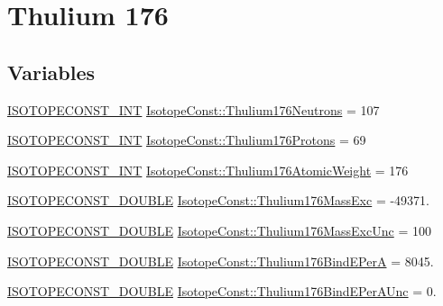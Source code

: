 \hypertarget{group___isotope_const-_thulium-_tm176}{}\section{Thulium 176}
\label{group___isotope_const-_thulium-_tm176}
\subsection*{Variables}
\begin{DoxyCompactItemize}
\item 
\mbox{\hyperlink{group___isotope_const-_macros_ga5f18360b3e99483a35c32d789e62621c}{I\+S\+O\+T\+O\+P\+E\+C\+O\+N\+S\+T\+\_\+\+I\+NT}} \mbox{\hyperlink{group___isotope_const-_thulium-_tm176_ga376e8fe714611eaf5e4bf0782cde3e6e}{Isotope\+Const\+::\+Thulium176\+Neutrons}} = 107
\item 
\mbox{\hyperlink{group___isotope_const-_macros_ga5f18360b3e99483a35c32d789e62621c}{I\+S\+O\+T\+O\+P\+E\+C\+O\+N\+S\+T\+\_\+\+I\+NT}} \mbox{\hyperlink{group___isotope_const-_thulium-_tm176_gaa7913fafe739b898368707e7558629c7}{Isotope\+Const\+::\+Thulium176\+Protons}} = 69
\item 
\mbox{\hyperlink{group___isotope_const-_macros_ga5f18360b3e99483a35c32d789e62621c}{I\+S\+O\+T\+O\+P\+E\+C\+O\+N\+S\+T\+\_\+\+I\+NT}} \mbox{\hyperlink{group___isotope_const-_thulium-_tm176_ga98bfb416e4308192d02c908471e7030b}{Isotope\+Const\+::\+Thulium176\+Atomic\+Weight}} = 176
\item 
\mbox{\hyperlink{group___isotope_const-_macros_ga8f45a7272ce02c0b4c65c44636ed719a}{I\+S\+O\+T\+O\+P\+E\+C\+O\+N\+S\+T\+\_\+\+D\+O\+U\+B\+LE}} \mbox{\hyperlink{group___isotope_const-_thulium-_tm176_ga06bffe2f883993703e49dcc008575cb9}{Isotope\+Const\+::\+Thulium176\+Mass\+Exc}} = -\/49371.
\item 
\mbox{\hyperlink{group___isotope_const-_macros_ga8f45a7272ce02c0b4c65c44636ed719a}{I\+S\+O\+T\+O\+P\+E\+C\+O\+N\+S\+T\+\_\+\+D\+O\+U\+B\+LE}} \mbox{\hyperlink{group___isotope_const-_thulium-_tm176_ga8392559cbf3ae92c4075d7c6a1362d3d}{Isotope\+Const\+::\+Thulium176\+Mass\+Exc\+Unc}} = 100
\item 
\mbox{\hyperlink{group___isotope_const-_macros_ga8f45a7272ce02c0b4c65c44636ed719a}{I\+S\+O\+T\+O\+P\+E\+C\+O\+N\+S\+T\+\_\+\+D\+O\+U\+B\+LE}} \mbox{\hyperlink{group___isotope_const-_thulium-_tm176_gac1cffcb1db956fda105a1c0c94e93b5d}{Isotope\+Const\+::\+Thulium176\+Bind\+E\+PerA}} = 8045.
\item 
\mbox{\hyperlink{group___isotope_const-_macros_ga8f45a7272ce02c0b4c65c44636ed719a}{I\+S\+O\+T\+O\+P\+E\+C\+O\+N\+S\+T\+\_\+\+D\+O\+U\+B\+LE}} \mbox{\hyperlink{group___isotope_const-_thulium-_tm176_ga9018c156e5119747ccc7d616d84663b7}{Isotope\+Const\+::\+Thulium176\+Bind\+E\+Per\+A\+Unc}} = 0.

\end{DoxyCompactItemize}
